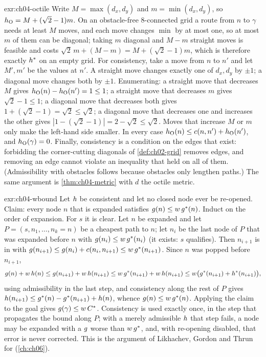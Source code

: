\begin{solution}{exr:ch04-octile}
Write $M=\max(d_x,d_y)$ and $m=\min(d_x,d_y)$, so $h_{\mathrm{O}}=M+(\sqrt2-1)m$. On an obstacle-free 8-connected grid a route from $n$ to $\gamma$ needs at least $M$ moves, and each move changes $\min$ by at most one, so at most $m$ of them can be diagonal; taking $m$ diagonal and $M-m$ straight moves is feasible and costs $\sqrt2\,m+(M-m)=M+(\sqrt2-1)m$, which is therefore exactly $h^*$ on an empty grid. For consistency, take a move from $n$ to $n'$ and let $M',m'$ be the values at $n'$. A straight move changes exactly one of $d_x,d_y$ by $\pm1$; a diagonal move changes both by $\pm1$. Enumerating: a straight move that decreases $M$ gives $h_{\mathrm{O}}(n)-h_{\mathrm{O}}(n')=1\le 1$; a straight move that decreases $m$ gives $\sqrt2-1\le1$; a diagonal move that decreases both gives $1+(\sqrt2-1)=\sqrt2\le\sqrt2$; a diagonal move that decreases one and increases the other gives $|1-(\sqrt2-1)|=2-\sqrt2\le\sqrt2$. Moves that increase $M$ or $m$ only make the left-hand side smaller. In every case $h_{\mathrm{O}}(n)\le c(n,n')+h_{\mathrm{O}}(n')$, and $h_{\mathrm{O}}(\gamma)=0$. Finally, consistency is a condition on the edges that exist: forbidding the corner-cutting diagonals of \cref{def:ch02-grid} removes edges, and removing an edge cannot violate an inequality that held on all of them. (Admissibility with obstacles follows because obstacles only lengthen paths.) The same argument is \cref{thm:ch04-metric} with $d$ the octile metric.
\end{solution}

\begin{solution}{exr:ch04-wbound}
Let $h$ be consistent and let no closed node ever be re-opened. Claim: every node $n$ that is expanded satisfies $g(n)\le w\,g^*(n)$. Induct on the order of expansion. For $s$ it is clear. Let $n$ be expanded and let $P=(s,n_1,\dots,n_k=n)$ be a cheapest path to $n$; let $n_i$ be the last node of $P$ that was expanded before $n$ with $g(n_i)\le w\,g^*(n_i)$ (it exists: $s$ qualifies). Then $n_{i+1}$ is in \Open with $g(n_{i+1})\le g(n_i)+c(n_i,n_{i+1})\le w\,g^*(n_{i+1})$. Since $n$ was popped before $n_{i+1}$,
\[g(n)+w\,h(n)\le g(n_{i+1})+w\,h(n_{i+1})\le w\,g^*(n_{i+1})+w\,h(n_{i+1})\le w\bigl(g^*(n_{i+1})+h^*(n_{i+1})\bigr),\]
using admissibility in the last step, and consistency along the rest of $P$ gives $h(n_{i+1})\le g^*(n)-g^*(n_{i+1})+h(n)$, whence $g(n)\le w\,g^*(n)$. Applying the claim to the goal gives $g(\gamma)\le w\,C^*$. Consistency is used exactly once, in the step that propagates the bound along $P$; with a merely admissible $h$ that step fails, a node may be expanded with a $g$ worse than $w\,g^*$, and, with re-opening disabled, that error is never corrected. This is the argument of Likhachev, Gordon and Thrun for \arastar (\cref{ch:ch06}).
\end{solution}

